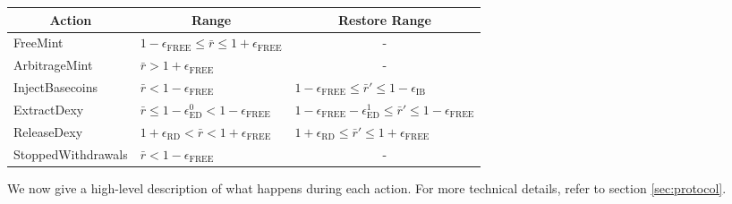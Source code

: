 \documentclass{ifcolog}
\newcommand{\rr}{\bar{r}}
\newcommand{\epsilonfree}{\epsilon_{\textrm{FREE}}}
\begin{document}
\begin{table}[h]
\begin{tabular}{|l|l|l|}
\hline
\multicolumn{1}{|c|}{\textbf{Action}} & \multicolumn{1}{c|}{\textbf{Range}}                                     & \multicolumn{1}{c|}{\textbf{Restore Range}}                                                           \\ \hline
FreeMint                              & $1- \epsilon_{\textrm{FREE}} \le \rr \le 1+ \epsilon_{\textrm{FREE}}$   & \multicolumn{1}{c|}{-}                                                                                \\ \hline
ArbitrageMint                         & $\rr > 1 + \epsilon_{\textrm{FREE}}$                                    & \multicolumn{1}{c|}{-}                                                                                \\ \hline
InjectBasecoins                       & $\rr < 1 - \epsilon_{\textrm{FREE}}$                                    & $1 - \epsilon_{\textrm{FREE}} \le \rr' \le 1-\epsilon_{\textrm{IB}}$                                  \\ \hline
ExtractDexy                           & $\rr \le 1 - \epsilon_{\textrm{ED}}^{0} < 1 - \epsilon_{\textrm{FREE}}$ & $1 - \epsilon_{\textrm{FREE}} - \epsilon_{\textrm{ED}}^{1} \le \rr' \le 1-\epsilon_{\textrm{FREE}}$   \\ \hline
ReleaseDexy                           & $1 + \epsilon_{\textrm{RD}} < \rr <  1 + \epsilon_{\textrm{FREE}}$      & $1 + \epsilon_{\textrm{RD}} \le \rr' \le 1 + \epsilonfree$                                                                 \\ \hline
StoppedWithdrawals                    & $\rr < 1 - \epsilon_{\textrm{FREE}}$                                    & \multicolumn{1}{c|}{-}                                                                  \\ \hline
\end{tabular}
\end{table}

We now give a high-level description of what happens during each action. For more technical details, refer to section \ref{sec:protocol}.
\end{document}
